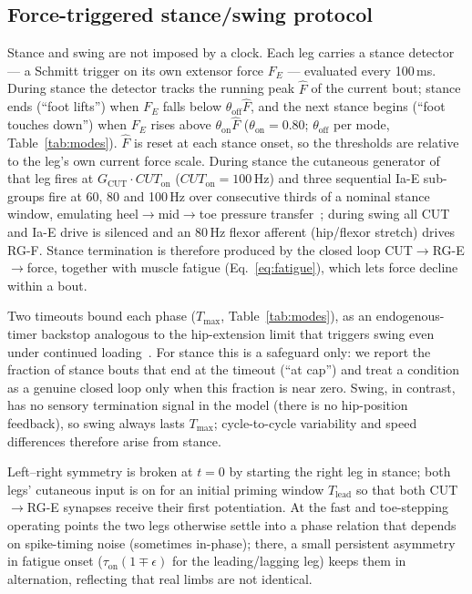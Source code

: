 \subsection{Force-triggered stance/swing protocol}\label{sec:methods:paced}
Stance and swing are not imposed by a clock. Each leg carries a stance
detector --- a Schmitt trigger on its own extensor force $F_E$ ---
evaluated every 100\,ms. During stance the detector tracks the running peak
$\hat F$ of the current bout; stance ends (``foot lifts'') when $F_E$ falls
below $\theta_{\text{off}}\hat F$, and the next stance begins (``foot
touches down'') when $F_E$ rises above $\theta_{\text{on}}\hat F$
($\theta_{\text{on}}=0.80$; $\theta_{\text{off}}$ per mode,
Table~\ref{tab:modes}). $\hat F$ is reset at each stance onset, so the
thresholds are relative to the leg's own current force scale. During
stance the cutaneous generator of that leg fires at
$G_{\text{CUT}}\cdot CUT_{\text{on}}$ ($CUT_{\text{on}}=100$\,Hz) and three
sequential Ia-E sub-groups fire at 60, 80 and 100\,Hz over consecutive
thirds of a nominal stance window, emulating heel$\to$mid$\to$toe pressure
transfer~\cite{loebDuysens2018}; during swing all CUT and Ia-E drive is
silenced and an 80\,Hz flexor afferent (hip/flexor stretch) drives RG-F.
Stance termination is therefore produced by the closed loop
CUT$\to$RG-E$\to$force, together with muscle fatigue
(Eq.~\ref{eq:fatigue}), which lets force decline within a bout.

Two timeouts bound each phase ($T_{\max}$, Table~\ref{tab:modes}), as an
endogenous-timer backstop analogous to the hip-extension limit that
triggers swing even under continued loading~\cite{grillnerRossignol1978}.
For stance this is a safeguard only: we report the fraction of stance
bouts that end at the timeout (``at cap'') and treat a condition as a
genuine closed loop only when this fraction is near zero. Swing, in
contrast, has no sensory termination signal in the model (there is no
hip-position feedback), so swing always lasts $T_{\max}$; cycle-to-cycle
variability and speed differences therefore arise from stance.

Left--right symmetry is broken at $t=0$ by starting the right leg in
stance; both legs' cutaneous input is on for an initial priming window
$T_{\text{lead}}$ so that both CUT$\to$RG-E synapses receive their first
potentiation. At the fast and toe-stepping operating points the two legs
otherwise settle into a phase relation that depends on spike-timing noise
(sometimes in-phase); there, a small persistent asymmetry in fatigue onset
($\tau_{\text{on}}(1\mp\epsilon)$ for the leading/lagging leg) keeps them
in alternation, reflecting that real limbs are not identical.

